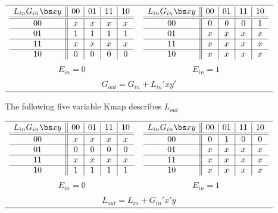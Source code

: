 \begin{enumerate}
\begin{solution}
{\begin{tabular}{cc}
$\begin{array} {c||c|c|c|c}
 L_{in} G_{in}  \bs x  y & 00 & 01 & 11 & 10 \\ \hline \hline
       		00       & x  & x  & x  & x  \\ \hline
       		01       & 1  & 1  & 1  & 1  \\ \hline
       		11       & x  & x  & x  & x  \\ \hline
       		10       & 0  & 0  & 0  & 0  \\
\end{array}$ 
&
$\begin{array} {c||c|c|c|c}
 L_{in} G_{in}  \bs x  y & 00 & 01 & 11 & 10 \\ \hline \hline
       		00       & 0  & 0  & 0  & 1  \\ \hline
       		01       & x  & x  & x  & x  \\ \hline
       		11       & x  & x  & x  & x  \\ \hline
       		10       & x  & x  & x  & x  \\
\end{array}$  \\
$E_{in}=0$ & $E_{in}=1$ \\
\multicolumn{2}{c}{$G_{out} = G_{in} + L_{in}'xy'$} \\
\end{tabular}

The following five variable Kmap describes $L_{out}$

\begin{tabular}{cc}
$\begin{array} {c||c|c|c|c}
 L_{in} G_{in}  \bs x  y & 00 & 01 & 11 & 10 \\ \hline \hline
       		00       & x  & x  & x  & x  \\ \hline
       		01       & 0  & 0  & 0  & 0  \\ \hline
       		11       & x  & x  & x  & x  \\ \hline
       		10       & 1  & 1  & 1  & 1  \\
\end{array}$ 
&
$\begin{array} {c||c|c|c|c}
 L_{in} G_{in}  \bs x  y & 00 & 01 & 11 & 10 \\ \hline \hline
       		00       & 0  & 1  & 0  & 0  \\ \hline
       		01       & x  & x  & x  & x  \\ \hline
       		11       & x  & x  & x  & x  \\ \hline
       		10       & x  & x  & x  & x  \\
\end{array}$  \\
$E_{in}=0$ & $E_{in}=1$ \\
\multicolumn{2}{c}{$L_{out} = L_{in} + G_{in}'x'y$} \\
\end{tabular}
} \end{solution}


\end{enumerate}
